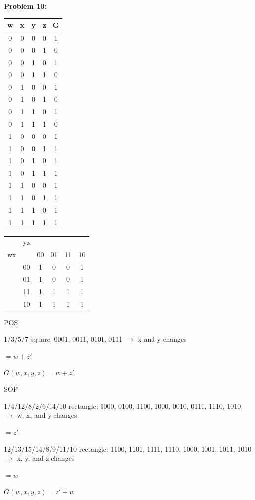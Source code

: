 \documentclass{article}
\begin{document}
    \textbf{Problem 10:}

    \begin{center}
        \begin{tabular} {cccc|c}
            w & x & y & z & G \\
            \hline
            0 & 0 & 0 & 0 & 1 \\
            0 & 0 & 0 & 1 & 0 \\
            0 & 0 & 1 & 0 & 1 \\
            0 & 0 & 1 & 1 & 0 \\
            0 & 1 & 0 & 0 & 1 \\
            0 & 1 & 0 & 1 & 0 \\
            0 & 1 & 1 & 0 & 1 \\
            0 & 1 & 1 & 1 & 0 \\
            1 & 0 & 0 & 0 & 1 \\
            1 & 0 & 0 & 1 & 1 \\
            1 & 0 & 1 & 0 & 1 \\
            1 & 0 & 1 & 1 & 1 \\
            1 & 1 & 0 & 0 & 1 \\
            1 & 1 & 0 & 1 & 1 \\
            1 & 1 & 1 & 0 & 1 \\
            1 & 1 & 1 & 1 & 1 \\
        \end{tabular}
    \end{center}

    \begin{center}
        \begin{tabular} {cc|cccc}
            & yz & &&& \\
            wx && 00 & 01 & 11 & 10 \\
            \hline
            & 00 & 1 & 0 & 0 & 1 \\
            & 01 & 1 & 0 & 0 & 1 \\
            & 11 & 1 & 1 & 1 & 1 \\
            & 10 & 1 & 1 & 1 & 1 \\
        \end{tabular}
    \end{center}

    POS

    1/3/5/7 square: 0001, 0011, 0101, 0111 $\rightarrow$ x and y changes

    \quad $=w+z'$

    $\boxed{G(w,x,y,z) = w+z'}$

    SOP

    1/4/12/8/2/6/14/10 rectangle: 0000, 0100, 1100, 1000, 0010, 0110, 1110, 1010
    $\rightarrow$ w, x, and y changes

    \quad $=z'$

    12/13/15/14/8/9/11/10 rectangle: 1100, 1101, 1111, 1110, 1000, 1001, 1011, 1010
    $\rightarrow$ x, y, and z changes

    \quad $=w$

    $\boxed{G(w,x,y,z) = z' + w}$
\end{document}
